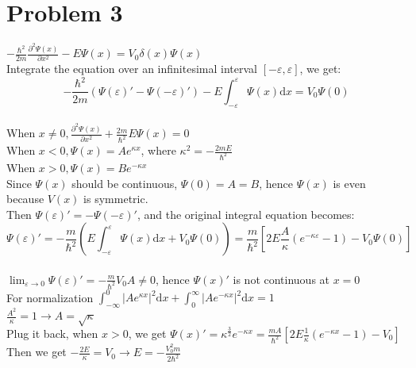 \documentclass[a4paper]{article}
\begin{document}
\section{Problem 3}
\noindent$-\frac{\hbar^2}{2m}\frac{\partial^2\Psi(x)}{\partial x^2}-E\Psi(x)=V_0\delta(x)\Psi(x)$
\\Integrate the equation over an infinitesimal interval $[-\varepsilon,\varepsilon]$, we get:
\\$$-\frac{\hbar^2}{2m}(\Psi(\varepsilon)'-\Psi(-\varepsilon)')-E\int_{-\varepsilon}^\varepsilon\Psi(x)\mathrm{d}x=V_0\Psi(0)$$
\\When $x\neq0,\frac{\partial^2\Psi(x)}{\partial x^2}+\frac{2m}{\hbar^2}E\Psi(x)=0$
\\When $x<0,\Psi(x)=Ae^{\kappa x}$, where $\kappa^2=-\frac{2mE}{\hbar^2}$
\\When $x>0,\Psi(x)=Be^{-\kappa x}$
\\Since $\Psi(x)$ should be continuous, $\Psi(0)=A=B$, hence $\Psi(x)$ is even because $V(x)$ is symmetric.
\\Then $\Psi(\varepsilon)'=-\Psi(-\varepsilon)'$, and the original integral equation becomes: 
\\$$\Psi(\varepsilon)'=-\frac{m}{\hbar^2}(E\int_{-\varepsilon}^\varepsilon\Psi(x)\mathrm{d}x+V_0\Psi(0))=\frac{m}{\hbar^2}[2E\frac{A}{\kappa}(e^{-\kappa\varepsilon}-1)-V_0\Psi(0)]$$
\\$\lim_{\varepsilon\rightarrow0}\Psi(\varepsilon)'=-\frac{m}{\hbar^2}V_0A\neq 0$, hence $\Psi(x)'$ is not continuous at $x=0$
\\For normalization $\int_{-\infty}^0|Ae^{\kappa x}|^2\mathrm{d}x+\int_0^{\infty}|Ae^{-\kappa x}|^2\mathrm{d}x=1$
\\$\frac{A^2}{\kappa}=1\rightarrow A=\sqrt{\kappa}$
\\Plug it back, when $x>0$, we get $\Psi(x)'=\kappa^\frac{3}{2}e^{-\kappa x}=\frac{mA}{\hbar^2}[2E\frac{1}{\kappa}(e^{-\kappa x}-1)-V_0]$
\\Then we get $-\frac{2E}{\kappa}=V_0\rightarrow E=-\frac{V_0^2m}{2\hbar^2}$
\end{document}
